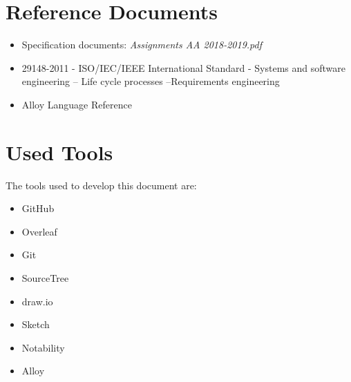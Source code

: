 \section{Reference Documents}
\begin{itemize}

\item Specification documents: \emph{Assignments AA 2018-2019.pdf}

\item 29148-2011 - ISO/IEC/IEEE International Standard - Systems and software engineering -- Life cycle processes --Requirements engineering

\item Alloy Language Reference
\end{itemize}

\section{Used Tools}

The tools used to develop this document are:

\begin{itemize}
    \item GitHub
    \item Overleaf
    \item Git
    \item SourceTree
    \item draw.io
    \item Sketch
    \item Notability
    \item Alloy
\end{itemize}